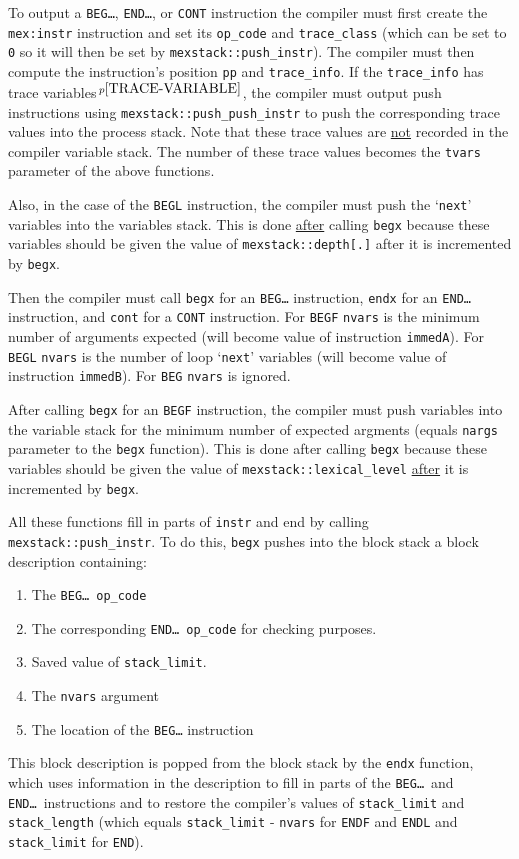\documentclass[12pt]{article}
\newcommand{\pagnote}[1]{$\,^{p\pageref{#1}}$}
\newcommand{\EOL}{\penalty \exhyphenpenalty}
\newenvironment{indpar}[1][0.3in]%
	{\begin{list}{}%
		     {\setlength{\itemsep}{0in}%
		      \setlength{\topsep}{0in}%
		      \setlength{\parsep}{1ex}%
		      \setlength{\labelwidth}{#1}%
		      \setlength{\leftmargin}{#1}%
		      \addtolength{\leftmargin}{\labelsep}}%
	 \item}%
	{\end{list}}
\begin{document}
\begin{indpar}
To output a {\tt BEG\ldots}, {\tt END\ldots}, or {\tt CONT} instruction
the compiler must first create the {\tt mex:instr} instruction and set
its {\tt op\_code} and {\tt trace\_class} (which can be set to {\tt 0}
so it will then be set by {\tt mexstack::push\_instr}).  The compiler must then
compute the instruction's position {\tt pp} and {\tt trace\_info}.
If the {\tt trace\_info} has
trace variables\pagnote{TRACE-VARIABLE}, the
compiler must output push instructions using
{\tt mexstack::\EOL push\_\EOL push\_\EOL instr}
to push the corresponding trace values into the process stack.
Note that these trace values are \underline{not} recorded in the
compiler variable stack.  The number of these trace values becomes
the {\tt tvars} parameter of the above functions.

Also, in the case of the {\tt BEGL} instruction, the compiler must
push the `{\tt next}' variables into the variables stack.
This is done \underline{after} calling {\tt begx} because these
variables should
be given the value of {\tt mexstack::depth[.]} after it is
incremented by {\tt begx}.

Then the compiler must call {\tt begx} for an {\tt BEG\ldots} instruction,
{\tt endx} for an {\tt END\ldots} instruction, and {\tt cont} for
a {\tt CONT} instruction.  For {\tt BEGF} {\tt nvars} is the minimum number
of arguments expected (will become value of instruction {\tt immedA}).
For {\tt BEGL} {\tt nvars} is the number of loop `{\tt next}' variables
(will become value of instruction {\tt immedB}).  For {\tt BEG} {\tt nvars}
is ignored.

After calling {\tt begx} for an {\tt BEGF} instruction, the compiler
must push variables into the variable stack for the minimum number of
expected argments (equals {\tt nargs} parameter to the {\tt begx} function).
This is done after calling {\tt begx} because these variables should
be given the value of {\tt mexstack::lexical\_level} \underline{after} it is
incremented by {\tt begx}.

All these functions fill in parts of {\tt instr} and end by calling
{\tt mexstack::push\_instr}.  To do this, {\tt begx} pushes into the
block stack a block description containing:
\begin{enumerate}
\item The {\tt BEG\ldots}~{\tt op\_code}
\item The corresponding {\tt END\ldots}~{\tt op\_code} for checking purposes.
\item Saved value of {\tt stack\_limit}.
\item The {\tt nvars} argument
\item The location of the {\tt BEG\ldots} instruction
\end{enumerate}
This block description is popped from the block stack by the {\tt endx}
function, which uses information in the description to fill in parts of the
{\tt BEG\ldots}~and {\tt END\ldots}~instructions and to restore the compiler's
values of {\tt stack\_limit} and {\tt stack\_length} (which equals
{\tt stack\_limit} - {\tt nvars} for {\tt ENDF} and {\tt ENDL}
and {\tt stack\_limit} for {\tt END}).


\end{indpar}
\end{document}
